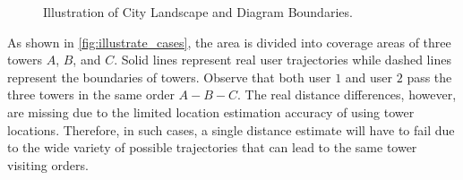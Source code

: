 \begin{figure}
  \centering
  \vspace{-0.1in}
  \caption{Illustration of City Landscape and Diagram Boundaries.}
  \vspace{-0.1in}
\end{figure}


As shown in \autoref{fig:illustrate_cases}, the area is divided into coverage areas of three towers $A$, $B$, and $C$. Solid lines represent real user trajectories while dashed lines represent the boundaries of towers. Observe that both user $1$ and user $2$ pass the three towers in the same order $A - B - C$. The real distance differences, however, are missing due to the limited location estimation accuracy of using tower locations. Therefore, in such cases, a single distance estimate will have to fail due to the wide variety of possible trajectories that can lead to the same tower visiting orders.

